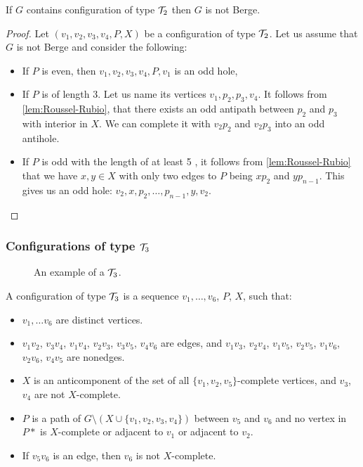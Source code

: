 \begin{lemma}
	If $G$ contains configuration of type $\mathcal{T}_2$ then $G$ is not Berge.
\end{lemma}
\begin{proof}
	Let $(v_1, v_2, v_3, v_4, P, X)$ be a configuration of type $\mathcal{T}_2$. Let us assume that $G$ is not Berge and consider the following:
	\begin{itemize}
		\item If $P$ is even, then $v_1, v_2, v_3, v_4, P, v_1$ is an odd hole,
		\item If $P$ is of length 3.  Let us name its vertices $v_1, p_2, p_3, v_4$. It follows from \cref{lem:Roussel-Rubio}, that there exists an odd antipath between $p_2$ and $p_3$ with interior in $X$. We can complete it with $v_2p_2$ and $v_2p_3$ into an odd antihole.
		\item If $P$ is odd with the length of at least 5 , it follows from \cref{lem:Roussel-Rubio} that we have $x, y \in X$ with only two edges to $P$ being $xp_2$ and $yp_{n-1}$. This gives us an odd hole: $v_2, x, p_2, \ldots, p_{n-1}, y, v_2$.
	\end{itemize}
\end{proof}

\subsubsection{Configurations of type $\mathcal{T}_3$}

\begin{wrapfigure}{r}{0.35\textwidth}
	
	\caption{An example of a $\mathcal{T}_3$.}%
	\vspace{-1.5cm}
\end{wrapfigure}

A configuration of type $\mathcal{T}_3$ is a sequence $v_1, \ldots, v_6$, $P$, $X$, such that:
\begin{itemize}
	\item $v_1, \ldots v_6$ are distinct vertices.
	\item $v_1v_2$, $v_3v_4$, $v_1v_4$, $v_2v_3$, $v_3v_5$, $v_4v_6$ are edges, and $v_1v_3$, $v_2v_4$, $v_1v_5$, $v_2v_5$, $v_1v_6$, $v_2v_6$, $v_4v_5$ are nonedges.
	\item $X$ is an anticomponent of the set of all $\{v_1, v_2, v_5\}$-complete vertices, and $v_3$, $v_4$ are not $X$-complete.
	\item $P$ is a path of $G \setminus ( X \cup \{v_1, v_2, v_3, v_4\} )$ between $v_5$ and $v_6$ and no vertex in $P*$ is $X$-complete or adjacent to $v_1$ or adjacent to $v_2$.
	\item If $v_5v_6$ is an edge, then $v_6$ is not $X$-complete.
\end{itemize}

